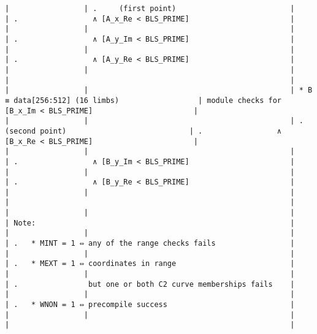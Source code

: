 \documentclass[varwidth=\maxdimen,margin=0.5cm,multi={verbatim}]{standalone}
\begin{document}
\begin{verbatim}
|                 | .     (first point)                          |                                                 | .                 ∧ [A_x_Re < BLS_PRIME]                       |
|                 |                                              |                                                 | .                 ∧ [A_y_Im < BLS_PRIME]                       |
|                 |                                              |                                                 | .                 ∧ [A_y_Re < BLS_PRIME]                       |
|                 |                                              |                                                 |                                                                |
|                 |                                              | * B ≡ data[256:512] (16 limbs)                  | module checks for   [B_x_Im < BLS_PRIME]                       |
|                 |                                              | .     (second point)                            | .                 ∧ [B_x_Re < BLS_PRIME]                       |
|                 |                                              |                                                 | .                 ∧ [B_y_Im < BLS_PRIME]                       |
|                 |                                              |                                                 | .                 ∧ [B_y_Re < BLS_PRIME]                       |
|                 |                                              |                                                 |                                                                |
|                 |                                              |                                                 | Note:                                                          |
|                 |                                              |                                                 | .   * MINT = 1 ⇔ any of the range checks fails                 |
|                 |                                              |                                                 | .   * MEXT = 1 ⇔ coordinates in range                          |
|                 |                                              |                                                 | .                but one or both C2 curve memberships fails    |
|                 |                                              |                                                 | .   * WNON = 1 ⇔ precompile success                            |
|                 |                                              |                                                 |                                                                |

\end{verbatim}
\end{document}
